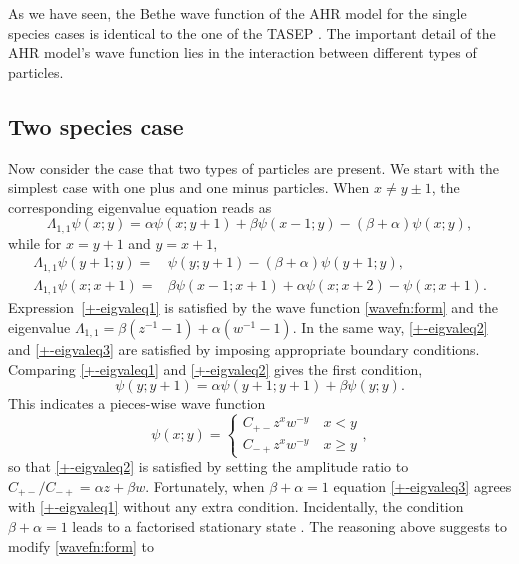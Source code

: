 \documentclass[cmp]{svjour}
\numberwithin{theorem}{section}
\numberwithin{equation}{section}
\begin{document}
As we have seen, the Bethe wave function of the AHR model for the single species cases is identical to the one of the TASEP \cite{S1997}. The important detail of the AHR model's wave function lies in the interaction between different types of particles.

\subsection{Two species case}
Now consider the case that two types of particles are present. We start with the simplest case with one plus and one minus particles. When $x\neq y\pm 1$, the corresponding eigenvalue equation reads as
\begin{equation}
\Lambda_{1,1} \psi(x;y)
=
\alpha  \psi(x;y+1)  + \beta \psi(x-1;y) - (\beta+\alpha )\psi(x;y),
\label{+-eigvaleq1}
\end{equation}
while for $x=y+1$ and $y=x+1$,
\begin{align}
\Lambda_{1,1}\psi(y+1;y)
=&
\psi(y;y+1) - (\beta+\alpha )\psi(y+1;y),
\label{+-eigvaleq2}
\\
\Lambda_{1,1}\psi(x;x+1)
=&
\beta\psi(x-1;x+1) + \alpha \psi(x;x+2) - \psi(x;x+1).
\label{+-eigvaleq3}
\end{align}
Expression~\eqref{+-eigvaleq1} is satisfied by the wave function \eqref{wavefn:form} and the eigenvalue $\Lambda_{1,1}=\beta(z^{-1}-1) +\alpha (w^{-1}-1)$. In the same way, \eqref{+-eigvaleq2} and \eqref{+-eigvaleq3} are satisfied by imposing appropriate boundary conditions. Comparing \eqref{+-eigvaleq1} and \eqref{+-eigvaleq2} gives the first condition,
\begin{equation*}
\psi(y;y+1)
=
\alpha \psi(y+1;y+1) +
\beta\psi(y;y).
\end{equation*}
This indicates a pieces-wise wave function 
\begin{equation*}
\psi(x;y) = \left\{
\begin{array}{l}
\displaystyle C_{+-} z^{x} w^{-y}\quad x<y\\
\displaystyle C_{-+} z^{x} w^{-y}\quad x\geq y
\end{array}\right. ,
\end{equation*}
so that \eqref{+-eigvaleq2} is satisfied by setting the amplitude ratio to $C_{+-}/C_{-+}=\alpha z+\beta w$. Fortunately, when $\beta+\alpha =1$ equation \eqref{+-eigvaleq3} agrees with \eqref{+-eigvaleq1} without any extra condition. Incidentally, the condition $\beta+\alpha =1$ leads to a factorised stationary state \cite{RSS2000}. The reasoning above suggests to modify \eqref{wavefn:form} to
\end{document}
